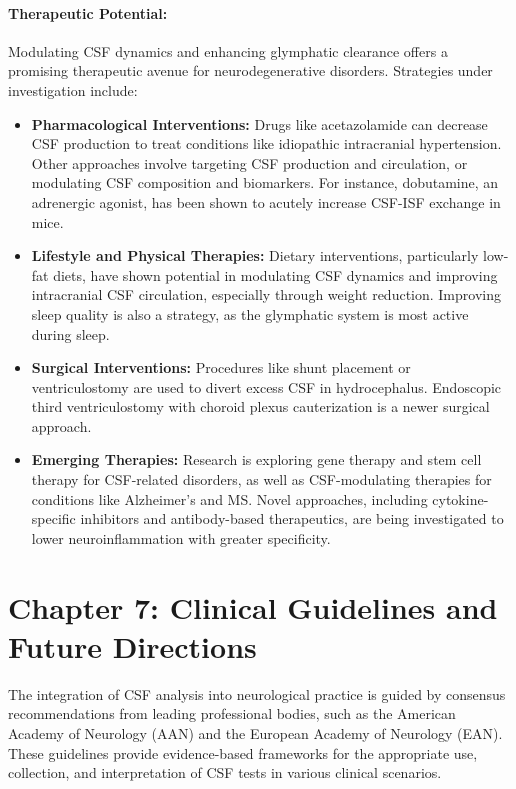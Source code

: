 	\paragraph{Therapeutic Potential:} Modulating CSF dynamics and enhancing glymphatic clearance offers a promising therapeutic avenue for neurodegenerative disorders. Strategies under investigation include:
	\begin{itemize}
		\item \textbf{Pharmacological Interventions:} Drugs like acetazolamide can decrease CSF production to treat conditions like idiopathic intracranial hypertension. Other approaches involve targeting CSF production and circulation, or modulating CSF composition and biomarkers. For instance, dobutamine, an adrenergic agonist, has been shown to acutely increase CSF-ISF exchange in mice.
		\item \textbf{Lifestyle and Physical Therapies:} Dietary interventions, particularly low-fat diets, have shown potential in modulating CSF dynamics and improving intracranial CSF circulation, especially through weight reduction. Improving sleep quality is also a strategy, as the glymphatic system is most active during sleep.
		\item \textbf{Surgical Interventions:} Procedures like shunt placement or ventriculostomy are used to divert excess CSF in hydrocephalus. Endoscopic third ventriculostomy with choroid plexus cauterization is a newer surgical approach.
		\item \textbf{Emerging Therapies:} Research is exploring gene therapy and stem cell therapy for CSF-related disorders, as well as CSF-modulating therapies for conditions like Alzheimer's and MS. Novel approaches, including cytokine-specific inhibitors and antibody-based therapeutics, are being investigated to lower neuroinflammation with greater specificity.
	\end{itemize}
	
	\section*{Chapter 7: Clinical Guidelines and Future Directions}
	
	The integration of CSF analysis into neurological practice is guided by consensus recommendations from leading professional bodies, such as the American Academy of Neurology (AAN) and the European Academy of Neurology (EAN). These guidelines provide evidence-based frameworks for the appropriate use, collection, and interpretation of CSF tests in various clinical scenarios.
	
